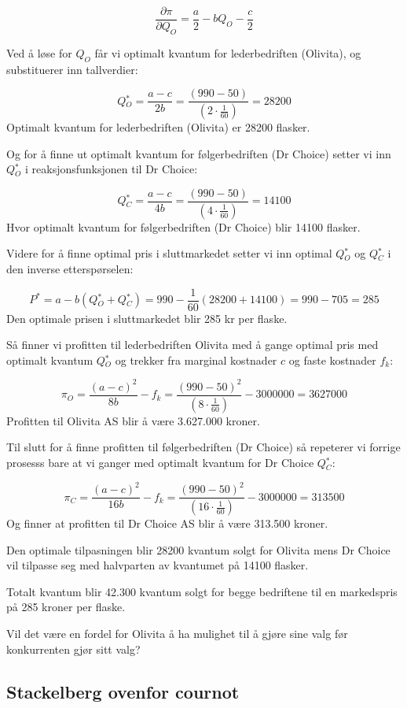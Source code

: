\documentclass[
  12pt,
  a4paper,
  DIV=11,
  numbers=noendperiod]{scrartcl}
\begin{document}
\[\frac{\partial \pi}{\partial Q_O} = \frac{a}{2}-bQ_O - \frac{c}{2} \tag{4}\]

Ved å løse for \(Q_O\) får vi optimalt kvantum for lederbedriften
(Olivita), og substituerer inn tallverdier:

\[Q{_O^*} = \frac{a-c}{2b} = \frac{(990 - 50)}{(2 \cdot \frac{1}{60})}  = 28200 \tag{5}\]
Optimalt kvantum for lederbedriften (Olivita) er 28200 flasker.

Og for å finne ut optimalt kvantum for følgerbedriften (Dr Choice)
setter vi inn \(Q{_O^*}\) i reaksjonsfunksjonen til Dr Choice:

\[Q{_C^*} = \frac{a-c}{4b} = \frac{(990 - 50)}{(4 \cdot \frac{1}{60})} = 14100 \tag{6}\]
Hvor optimalt kvantum for følgerbedriften (Dr Choice) blir 14100
flasker.

Videre for å finne optimal pris i sluttmarkedet setter vi inn optimal
\(Q{_O^*}\) og \(Q{_C^*}\) i den inverse etterspørselen:

\[P^* = a - b(Q{_O^*}+Q{_C^*}) = 990 - \frac{1}{60}(28200+14100) = 990 - 705 = 285 \tag{7}\]
Den optimale prisen i sluttmarkedet blir 285 kr per flaske.

Så finner vi profitten til lederbedriften Olivita med å gange optimal
pris med optimalt kvantum \(Q{_O^*}\) og trekker fra marginal kostnader
\(c\) og faste kostnader \(f_k\):

\[ \pi_O = \frac{(a-c)^2}{8b} - f_k =  \frac{(990-50)^2}{(8 \cdot \frac{1}{60})} - 3000000 = 3627000 \tag{8}\]
Profitten til Olivita AS blir å være 3.627.000 kroner.

\clearpage

Til slutt for å finne profitten til følgerbedriften (Dr Choice) så
repeterer vi forrige prosesss bare at vi ganger med optimalt kvantum for
Dr Choice \(Q{_C^*}\):

\[\pi_C = \frac{(a-c)^2}{16b} - f_k =  \frac{(990-50)^2}{(16 \cdot \frac{1}{60})} - 3000000 = 313500 \tag{9}\]
Og finner at profitten til Dr Choice AS blir å være 313.500 kroner.

Den optimale tilpasningen blir 28200 kvantum solgt for Olivita mens Dr
Choice vil tilpasse seg med halvparten av kvantumet på 14100 flasker.

Totalt kvantum blir 42.300 kvantum solgt for begge bedriftene til en
markedspris på 285 kroner per flaske.

Vil det være en fordel for Olivita å ha mulighet til å gjøre sine valg
før konkurrenten gjør sitt valg?

\subsection{Stackelberg ovenfor
cournot}\label{stackelberg-ovenfor-cournot}
\end{document}
